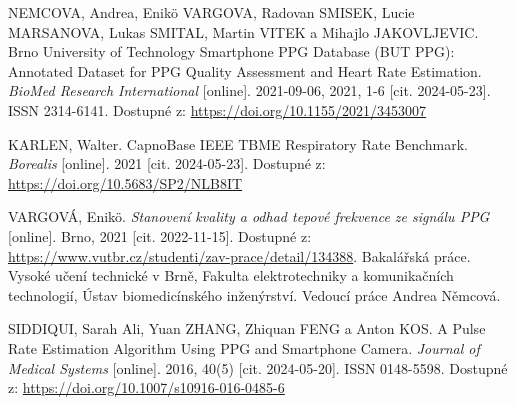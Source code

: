

\begin{thebibliography}{99}

		NEMCOVA, Andrea, Enikö VARGOVA, Radovan SMISEK, Lucie MARSANOVA, Lukas SMITAL, Martin VITEK a Mihajlo JAKOVLJEVIC.
		Brno University of Technology Smartphone PPG Database (BUT PPG): Annotated Dataset for PPG Quality Assessment and Heart Rate Estimation.
		\emph{BioMed Research International} [online].
		2021-09-06, 2021, 1-6 [cit. 2024-05-23].
		ISSN 2314-6141.
		Dostupné z: \url{https://doi.org/10.1155/2021/3453007}


		KARLEN, Walter.
		CapnoBase IEEE TBME Respiratory Rate Benchmark.
		\emph{Borealis} [online].
		2021 [cit. 2024-05-23].
		Dostupné z: \url{https://doi.org/10.5683/SP2/NLB8IT}

		VARGOVÁ, Enikö.
		\emph{Stanovení kvality a odhad tepové frekvence ze signálu PPG} [online].
		Brno, 2021 [cit. 2022-11-15].
		Dostupné z: \url{https://www.vutbr.cz/studenti/zav-prace/detail/134388}.
		Bakalářská práce. Vysoké učení technické v Brně, Fakulta elektrotechniky a komunikačních technologií, Ústav biomedicínského inženýrství.
		Vedoucí práce Andrea Němcová.

		SIDDIQUI, Sarah Ali, Yuan ZHANG, Zhiquan FENG a Anton KOS.
		A Pulse Rate Estimation Algorithm Using PPG and Smartphone Camera.
		\emph{Journal of Medical Systems} [online].
		2016, 40(5) [cit. 2024-05-20].
		ISSN 0148-5598.
		Dostupné z: \url{https://doi.org/10.1007/s10916-016-0485-6}


\end{thebibliography}
